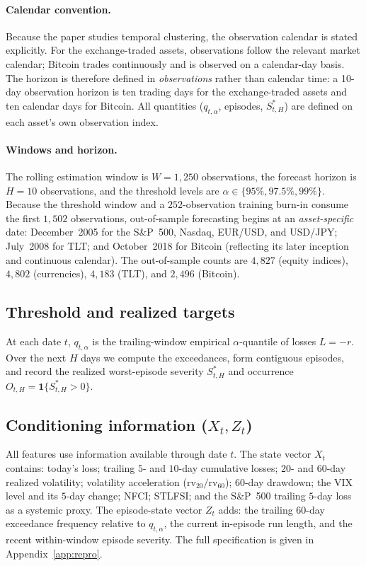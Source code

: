 \documentclass[11pt]{article}
\newcommand{\ind}{\mathbf{1}}
\begin{document}
\paragraph{Calendar convention.} Because the paper studies temporal clustering, the observation calendar is
stated explicitly. For the exchange-traded assets, observations follow the relevant market calendar; Bitcoin
trades continuously and is observed on a calendar-day basis. The horizon is therefore defined in
\emph{observations} rather than calendar time: a 10-day observation horizon is ten trading days for the
exchange-traded assets and ten calendar days for Bitcoin. All quantities ($q_{t,\alpha}$, episodes,
$S^{*}_{t,H}$) are defined on each asset's own observation index.

\paragraph{Windows and horizon.} The rolling estimation window is $W=1{,}250$ observations, the forecast
horizon is $H=10$ observations, and the threshold levels are $\alpha\in\{95\%,97.5\%,99\%\}$. Because the
threshold window and a $252$-observation training burn-in consume the first $1{,}502$ observations,
out-of-sample forecasting begins at an \emph{asset-specific} date: December~2005 for the S\&P~500, Nasdaq,
EUR/USD, and USD/JPY; July~2008 for TLT; and October~2018 for Bitcoin (reflecting its later inception and
continuous calendar). The out-of-sample counts are $4{,}827$ (equity indices), $4{,}802$ (currencies),
$4{,}183$ (TLT), and $2{,}496$ (Bitcoin).

\subsection{Threshold and realized targets}
At each date $t$, $q_{t,\alpha}$ is the trailing-window empirical $\alpha$-quantile of losses $L=-r$. Over
the next $H$ days we compute the exceedances, form contiguous episodes, and record the realized worst-episode
severity $S^{*}_{t,H}$ and occurrence $O_{t,H}=\ind\{S^{*}_{t,H}>0\}$.

\subsection{Conditioning information ($X_t,Z_t$)}
All features use information available through date $t$. The state vector $X_t$ contains: today's loss;
trailing $5$- and $10$-day cumulative losses; $20$- and $60$-day realized volatility; volatility
acceleration ($\mathrm{rv}_{20}/\mathrm{rv}_{60}$); $60$-day drawdown; the VIX level and its $5$-day change;
NFCI; STLFSI; and the S\&P~500 trailing $5$-day loss as a systemic proxy. The episode-state vector $Z_t$
adds: the trailing $60$-day exceedance frequency relative to $q_{t,\alpha}$, the current in-episode run
length, and the recent within-window episode severity. The full specification is given in
Appendix~\ref{app:repro}.
\end{document}

